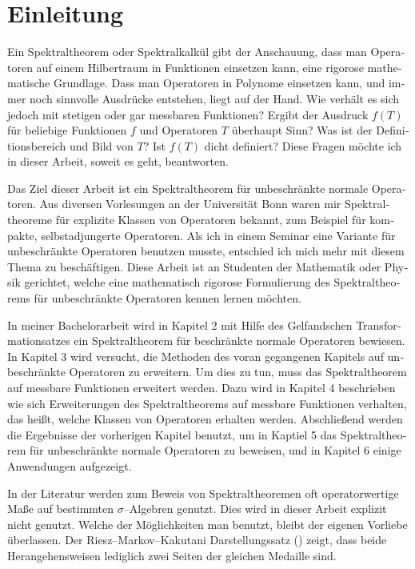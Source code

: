 \section*{Einleitung}


\begin{otherlanguage}{ngerman}
Ein Spektraltheorem oder Spektralkalkül gibt der Anschauung, dass man 
Operatoren auf einem Hilbertraum in Funktionen einsetzen kann, eine 
rigorose mathematische Grundlage.
Dass man Operatoren in Polynome einsetzen kann, und immer noch sinnvolle
Ausdrücke entstehen, liegt auf der Hand. Wie verhält es sich jedoch mit
stetigen oder gar messbaren Funktionen? Ergibt der Ausdruck $f(T)$ für
beliebige Funktionen $f$ und Operatoren $T$ überhaupt Sinn? Was ist 
der Definitionsbereich und Bild von $T$? Ist $f(T)$ dicht definiert?
Diese Fragen möchte ich in dieser Arbeit, soweit es geht, beantworten.

Das Ziel dieser Arbeit ist ein Spektraltheorem für unbeschränkte normale 
Operatoren. Aus diversen Vorlesungen an der Universität Bonn waren mir
Spektraltheoreme für explizite Klassen von Operatoren bekannt, zum 
Beispiel für kompakte, selbstadjungerte Operatoren. Als ich in einem Seminar
eine Variante für unbeschränkte Operatoren benutzen musste, entschied ich
mich mehr mit diesem Thema zu beschäftigen. Diese Arbeit
ist an Studenten der Mathematik oder Physik gerichtet, welche eine 
mathematisch rigorose Formulierung des Spektraltheorems
für unbeschränkte Operatoren kennen lernen möchten.

In meiner Bachelorarbeit wird in Kapitel 2 mit Hilfe des Gelfandschen 
Transformationsatzes ein Spektraltheorem für beschränkte normale Operatoren 
bewiesen. In Kapitel 3 wird versucht, die Methoden des voran gegangenen Kapitels
auf unbeschränkte Operatoren zu erweitern. Um dies zu tun, muss das 
Spektraltheorem auf messbare Funktionen erweitert werden.
Dazu wird in Kapitel 4 beschrieben wie sich Erweiterungen des 
Spektraltheorems auf messbare Funktionen verhalten, das heißt, welche Klassen
von Operatoren erhalten werden. Abschließend werden die Ergebnisse der 
vorherigen Kapitel benutzt, um in Kaptiel 5 das Spektraltheorem für unbeschränkte normale
Operatoren zu beweisen, und in Kapitel 6 einige Anwendungen aufgezeigt.

In der Literatur werden zum Beweis von Spektraltheoremen oft operatorwertige
Maße auf bestimmten $\sigma$--Algebren genutzt.
Dies wird in dieser Arbeit explizit nicht genutzt. Welche der Möglichkeiten
man benutzt, bleibt der eigenen Vorliebe überlassen. Der Riesz--Markov--Kakutani
Darstellungssatz (\cite[Theorem 6.3.4]{PedAnaN})
zeigt, dass beide Herangehensweisen
lediglich zwei Seiten der gleichen Medaille sind. 


\end{otherlanguage}
